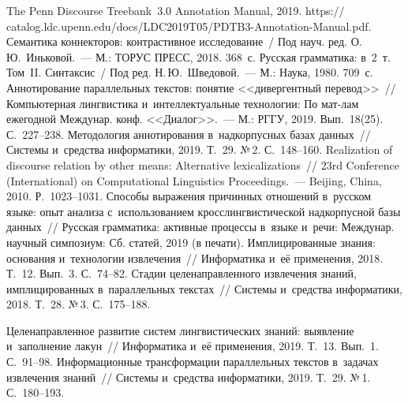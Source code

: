 \begin{multicols}{2}
{{\begin{thebibliography}{99}
 The Penn Discourse Treebank~3.0 Annotation 
Manual, 2019. {\sf https:// catalog.ldc.upenn.edu/docs/LDC2019T05/PDTB3-Annotation-Manual.pdf}.
Семантика коннекторов: контрастивное исследование~/ Под науч. ред.
О.\,Ю.~Иньковой.~---  М.: ТОРУС ПРЕСС, 2018. 368~с.
Русская грамматика: в~2~т. Том~II. Синтаксис~/ Под ред. Н.\,Ю.~Шведовой.~--- М.: Наука, 
1980. 709~с.
 Аннотирование параллельных текстов: понятие <<дивергентный 
перевод>>~// Компьютерная лингвистика и~интеллектуальные технологии: По мат-лам 
ежегодной Междунар. конф. <<Диалог>>.~--- М.: РГГУ, 2019. Вып.~18(25). С.~227--238.
 Методология аннотирования 
в~надкорпусных базах данных~// Системы и~средства информатики, 2019. Т.~29. №\,2. 
С.~148--160.
 Realization of discourse relation by other means: 
Alternative lexicalizations~// 23rd Conference (International) on Computational 
Linguistics Proceedings.~--- Beijing, China, 2010. Р.~1023--1031.
 Способы выражения причинных отношений 
в~русском языке: опыт анализа с~использованием кросслингвистической надкорпусной 
базы данных~// Русская грамматика: активные процессы в~языке и~речи: Междунар. 
научный симпозиум: Сб. статей, 2019 (в печати).
 Имплицированные знания: основания и~технологии извлечения~// 
Информатика и~её применения, 2018. Т.~12. Вып.~3. С.~74--82. 
 Стадии целенаправленного извлечения знаний, имплицированных 
в~параллельных текстах~// Системы и~средства информатики, 2018. Т.~28. №\,3.  
С.~175--188.

 Целенаправленное развитие систем лингвистических знаний: 
выявление и~заполнение лакун~// Информатика и~её применения, 2019. Т.~13. Вып.~1. 
С.~91--98.
 Информационные трансформации параллельных 
текстов в~задачах извлечения знаний~// Системы и~средства информатики, 2019. Т.~29. 
№\,1. С.~180--193.

 \end{thebibliography}

 }
 }

\end{multicols}

\vspace*{-9pt}

